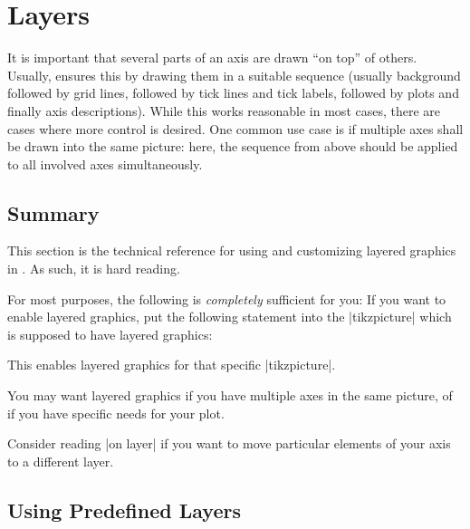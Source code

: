 
\section{Layers}

{

It is important that several parts of an axis are drawn ``on top'' of others.
Usually, \PGFPlots{} ensures this by drawing them in a suitable sequence
(usually background followed by grid lines, followed by tick lines and tick
labels, followed by plots and finally axis descriptions). While this works
reasonable in most cases, there are cases where more control is desired. One
common use case is if multiple axes shall be drawn into the same picture: here,
the sequence from above should be applied to all involved axes simultaneously.


\subsection{Summary}

This section is the technical reference for using and customizing layered
graphics in \PGFPlots{}. As such, it is hard reading.

For most purposes, the following is \emph{completely} sufficient for you: If
you want to enable layered graphics, put the following statement into the
|tikzpicture| which is supposed to have layered graphics:

\begin{codeexample}
\end{codeexample}
\noindent This enables layered graphics for that specific |tikzpicture|.

You may want layered graphics if you have multiple axes in the same picture, of
if you have specific needs for your plot.

Consider reading |on layer| if you want to move particular elements of your
axis to a different layer.


\subsection{Using Predefined Layers}

}
